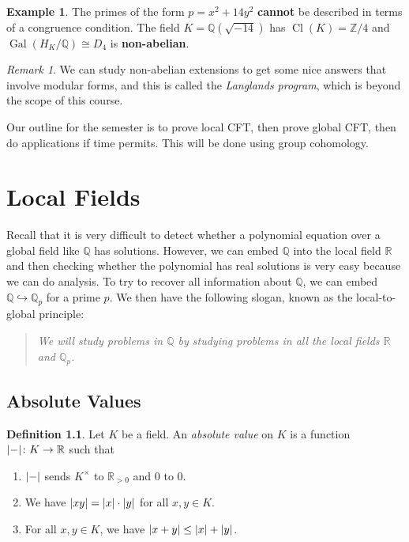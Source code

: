 \documentclass[leqno, openany]{memoir}
\theoremstyle{definition}
\newtheorem{defn}[thm]{Definition}
\newtheorem{exm}[thm]{Example}
\theoremstyle{remark}
\newtheorem{rmk}[thm]{Remark}
\theoremstyle{plain}
\theoremstyle{definition}
\theoremstyle{remark}
\newcommand{\R}{\mathbb{R}}
\newcommand{\Z}{\mathbb{Z}}
\newcommand{\Q}{\mathbb{Q}}
\DeclareMathOperator{\Gal}{Gal}
\DeclareMathOperator{\Cl}{Cl}
\begin{document}
\begin{exm} The primes of the form $p = x^2 + 14 y^2$ \textbf{cannot} be
described in terms of a congruence condition. The field $K = \Q(\sqrt{-14})$
has $\Cl(K) = \Z/4$ and $\Gal(H_K/\Q) \cong D_4$ is \textbf{non-abelian}.
\end{exm}

\begin{rmk} We can study non-abelian extensions to get some nice answers that
involve modular forms, and this is called the \textit{Langlands program}, which
is beyond the scope of this course.  \end{rmk}

Our outline for the semester is to prove local CFT, then prove global CFT, then
do applications if time permits. This will be done using group cohomology.

\chapter{Local Fields}%

Recall that it is very difficult to detect whether a polynomial equation over a
global field like $\Q$ has solutions. However, we can embed $\Q$ into the local
field $\R$ and then checking whether the polynomial has real solutions is very
easy because we can do analysis. To try to recover all information about $\Q$,
we can embed $\Q \hookrightarrow \Q_p$ for a prime $p$. We then have the
following slogan, known as the local-to-global principle:

\begin{quotation} \itshape We will study problems in $\Q$ by studying problems
in all the local fields $\R$ and $\Q_p$.  \end{quotation}

\section{Absolute Values}%

\begin{defn} Let $K$ be a field. An \textit{absolute value} on $K$ is a
    function $\abs{-} \colon K \to \R$ such that \begin{enumerate} \item
        $\abs{-}$ sends $K^{\times}$ to $\R_{>0}$ and $0$ to $0$.  \item We
        have $\abs{xy} = \abs{x} \cdot \abs{y}$ for all $x,y \in K$.  \item For
all $x,y \in K$, we have $\abs{x+y} \leq \abs{x} + \abs{y}$.  \end{enumerate}
\end{defn}
\end{document}
